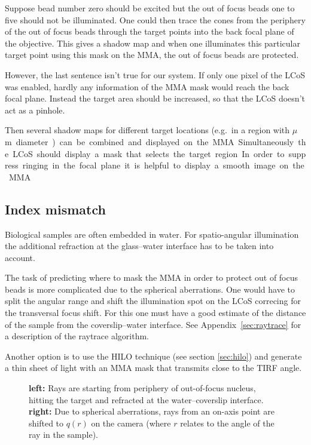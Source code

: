 Suppose bead number zero should be excited but the out of focus beads
one to five should not be illuminated. One could then trace the cones
from the periphery of the out of focus beads through the target points
into the back focal plane of the objective. This gives a shadow map
and when one illuminates this particular target point using this mask
on the MMA, the out of focus beads are protected.

However, the last sentence isn't true for our system. If only one
pixel of the LCoS was enabled, hardly any information of the MMA mask
would reach the back focal plane. Instead the target area should be
increased, so that the LCoS doesn't act as a pinhole.

Then several shadow maps for different target locations (e.g.\ in a
region with \unit[3]{$\mu$m} diameter) can be combined and displayed
on the MMA.  Simultaneously the LCoS should display a mask that
selects the target region. In order to suppress ringing in the focal
plane it is helpful to display a smooth image on the MMA.





\subsection{Index mismatch}

Biological samples are often embedded in water. For spatio-angular
illumination the additional refraction at the glass--water interface
has to be taken into account.

The task of predicting where to mask the MMA in order to protect out
of focus beads is more complicated due to the spherical
aberrations. One would have to split the angular range and shift the
illumination spot on the LCoS correcing for the transversal focus
shift. For this one must have a good estimate of the distance of the
sample from the coverslip--water interface. See
Appendix~\ref{sec:raytrace} for a description of the raytrace
algorithm.

Another option is to use the HILO technique (see section
\ref{sec:hilo}) and generate a thin sheet of light with an MMA mask
that transmits close to the TIRF angle.


\begin{figure}[!hbt]
  \centering
  \def\svgscale{.3}
   \quad 
  \caption{{\bf left:} Rays are starting from periphery of
    out-of-focus nucleus, hitting the target and refracted at the
    water--coverslip interface. {\bf right:} Due to spherical
    aberrations, rays from an on-axis point are shifted to $q(r)$ on
    the camera (where $r$ relates to the angle of the ray in the
    sample). }
\end{figure}
 
